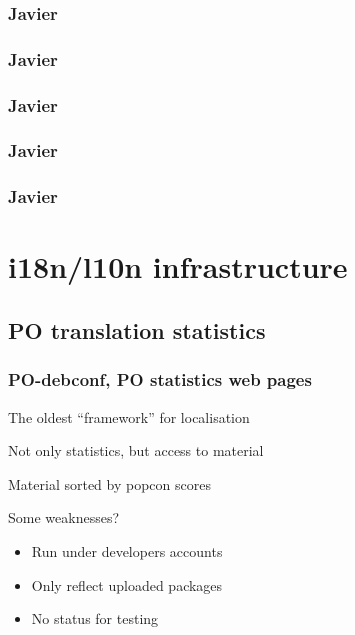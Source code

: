 \documentclass{beamer}
\begin{document}
\begin{frame}
  \frametitle{Javier}
\end{frame}

\begin{frame}
  \frametitle{Javier}
\end{frame}

\begin{frame}
  \frametitle{Javier}
\end{frame}

\begin{frame}
  \frametitle{Javier}
\end{frame}

\begin{frame}
  \frametitle{Javier}
\end{frame}

\section{i18n/l10n infrastructure}

\subsection{PO translation statistics}

\begin{frame}
  \frametitle{PO-debconf, PO statistics web pages}
	\begin{block}
		{The oldest ``framework'' for localisation}
	\end{block}
	\begin{block}
		{Not only statistics, but access to material}
	\end{block}
	\begin{block}
		{Material sorted by popcon scores}
	\end{block}
	\begin{block}
		{Some weaknesses?}
		\begin{itemize}
		\item
			Run under developers accounts
		\item
			Only reflect uploaded packages
		\item
			No status for testing
		\end{itemize}
	\end{block}
\end{frame}

\end{document}

